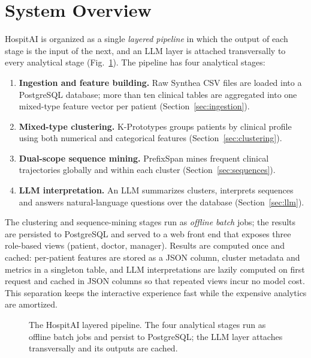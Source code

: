 \section{System Overview}\label{sec:overview}

HospitAI is organized as a single \emph{layered pipeline} in which the output of
each stage is the input of the next, and an LLM layer is attached transversally
to every analytical stage (Fig.~\ref{fig:architecture}). The pipeline has four
analytical stages:

\begin{enumerate}
  \item \textbf{Ingestion and feature building.} Raw Synthea CSV files are loaded
        into a PostgreSQL database; more than ten clinical tables are aggregated
        into one mixed-type feature vector per patient
        (Section~\ref{sec:ingestion}).
  \item \textbf{Mixed-type clustering.} K-Prototypes groups patients by clinical
        profile using both numerical and categorical features
        (Section~\ref{sec:clustering}).
  \item \textbf{Dual-scope sequence mining.} PrefixSpan mines frequent clinical
        trajectories globally and within each cluster
        (Section~\ref{sec:sequences}).
  \item \textbf{LLM interpretation.} An LLM summarizes clusters, interprets
        sequences and answers natural-language questions over the database
        (Section~\ref{sec:llm}).
\end{enumerate}

The clustering and sequence-mining stages run as \emph{offline batch} jobs; the
results are persisted to PostgreSQL and served to a web front end that exposes
three role-based views (patient, doctor, manager). Results are computed once and
cached: per-patient features are stored as a JSON column, cluster metadata and
metrics in a singleton table, and LLM interpretations are lazily computed on
first request and cached in JSON columns so that repeated views incur no model
cost. This separation keeps the interactive experience fast while the expensive
analytics are amortized.

\begin{figure}[!t]
  \centering
  \caption{The HospitAI layered pipeline. The four analytical stages run as
  offline batch jobs and persist to PostgreSQL; the LLM layer attaches
  transversally and its outputs are cached.}
  \label{fig:architecture}
\end{figure}

